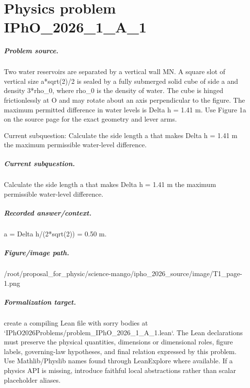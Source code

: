 
\chapter{Physics problem IPhO\_2026\_1\_A\_1}
\label{ch:IPhO2026Problems_problem_IPhO_2026_1_A_1}

\paragraph{Problem source.}
Two water reservoirs are separated by a vertical wall MN.  A square slot of
vertical size a*sqrt(2)/2 is sealed by a fully submerged solid cube of side a
and density 3*rho\_0, where rho\_0 is the density of water.  The cube is hinged
frictionlessly at O and may rotate about an axis perpendicular to the figure.
The maximum permitted difference in water levels is Delta h = 1.41 m.  Use
Figure 1a on the source page for the exact geometry and lever arms.

Current subquestion:
Calculate the side length a that makes Delta h = 1.41 m the maximum permissible water-level difference.

\paragraph{Current subquestion.}
Calculate the side length a that makes Delta h = 1.41 m the maximum permissible water-level difference.

\paragraph{Recorded answer/context.}
a = Delta h/(2*sqrt(2)) = 0.50 m.

\paragraph{Figure/image path.}
/root/proposal\_for\_physic/science-mango/ipho\_2026\_source/image/T1\_page-1.png

\paragraph{Formalization target.}
create a compiling Lean file with sorry bodies at `IPhO2026Problems/problem\_IPhO\_2026\_1\_A\_1.lean`. The Lean declarations must preserve the physical quantities, dimensions or dimensional roles, figure labels, governing-law hypotheses, and final relation expressed by this problem.
Use Mathlib/Physlib names found through LeanExplore where available. If a physics API is missing, introduce faithful local abstractions rather than scalar placeholder aliases.


